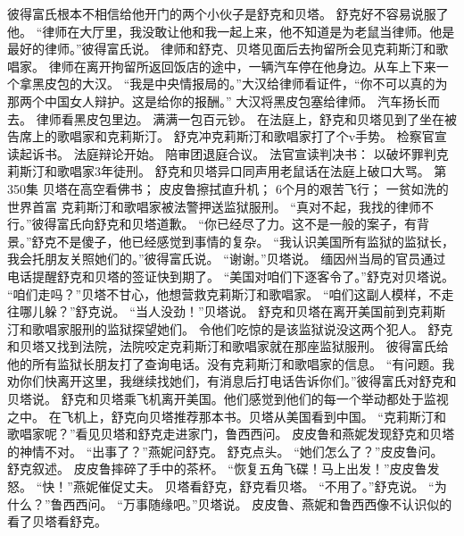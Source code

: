 \documentclass[a4paper,12pt,UTF8,twoside]{ctexbook}
\begin{document}
        彼得富氏根本不相信给他开门的两个小伙子是舒克和贝塔。  
        舒克好不容易说服了他。  
        “律师在大厅里，我没敢让他和我一起上来，他不知道是为老鼠当律师。他是最好的律师。”彼得富氏说。  
        律师和舒克、贝塔见面后去拘留所会见克莉斯汀和歌唱家。  
        律师在离开拘留所返回饭店的途中，一辆汽车停在他身边。从车上下来一个拿黑皮包的大汉。  
        “我是中央情报局的。”大汉给律师看证件，“你不可以真的为那两个中国女人辩护。这是给你的报酬。”  
        大汉将黑皮包塞给律师。  
        汽车扬长而去。  
        律师看黑皮包里边。  
        满满一包百元钞。  
        在法庭上，舒克和贝塔见到了坐在被告席上的歌唱家和克莉斯汀。  
        舒克冲克莉斯汀和歌唱家打了个v手势。  
        检察官宣读起诉书。  
        法庭辩论开始。  
        陪审团退庭合议。  
        法官宣读判决书：        
        以破坏罪判克莉斯汀和歌唱家3年徒刑。  
        舒克和贝塔异口同声用老鼠话在法庭上破口大骂。          第350集  
        贝塔在高空看佛书；  
        皮皮鲁擦拭直升机；  
        6个月的艰苦飞行；  
        一贫如洗的世界首富    
        克莉斯汀和歌唱家被法警押送监狱服刑。  
        “真对不起，我找的律师不行。”彼得富氏向舒克和贝塔道歉。  
        “你已经尽了力。这不是一般的案子，有背景。”舒克不是傻子，他已经感觉到事情的复杂。  
        “我认识美国所有监狱的监狱长，我会托朋友关照她们的。”彼得富氏说。  
        “谢谢。”贝塔说。  
        缅因州当局的官员通过电话提醒舒克和贝塔的签证快到期了。  
        “美国对咱们下逐客令了。”舒克对贝塔说。        
        “咱们走吗？”贝塔不甘心，他想营救克莉斯汀和歌唱家。  
        “咱们这副人模样，不走往哪儿躲？”舒克说。  
        “当人没劲！”贝塔说。  
        舒克和贝塔在离开美国前到克莉斯汀和歌唱家服刑的监狱探望她们。  
        令他们吃惊的是该监狱说没这两个犯人。  
        舒克和贝塔又找到法院，法院咬定克莉斯汀和歌唱家就在那座监狱服刑。  
        彼得富氏给他的所有监狱长朋友打了查询电话。没有克莉斯汀和歌唱家的信息。  
        “有问题。我劝你们快离开这里，我继续找她们，有消息后打电话告诉你们。”彼得富氏对舒克和贝塔说。  
        舒克和贝塔乘飞机离开美国。他们感觉到他们的每一个举动都处于监视之中。  
        在飞机上，舒克向贝塔推荐那本书。贝塔从美国看到中国。  
        “克莉斯汀和歌唱家呢？”看见贝塔和舒克走进家门，鲁西西问。  
        皮皮鲁和燕妮发现舒克和贝塔的神情不对。  
        “出事了？”燕妮问舒克。  
        舒克点头。  
        “她们怎么了？”皮皮鲁问。        
        舒克叙述。  
        皮皮鲁摔碎了手中的茶杯。  
        “恢复五角飞碟！马上出发！”皮皮鲁发怒。  
        “快！”燕妮催促丈夫。  
        贝塔看舒克，舒克看贝塔。  
        “不用了。”舒克说。  
        “为什么？”鲁西西问。  
        “万事随缘吧。”贝塔说。  
        皮皮鲁、燕妮和鲁西西像不认识似的看了贝塔看舒克。  
\end{document}
